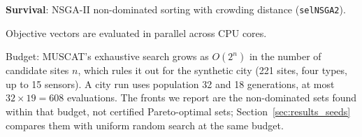 \textbf{Survival}: NSGA-II non-dominated sorting with crowding distance (\texttt{selNSGA2}).

Objective vectors are evaluated in parallel across CPU cores.

Budget: MUSCAT's exhaustive search grows as \(O(2^n)\) in the number of candidate sites \(n\), which rules it out for the synthetic city (221 sites, four types, up to 15 sensors). A city run uses population 32 and 18 generations, at most \(32\times19=608\) evaluations. The fronts we report are the non-dominated sets found within that budget, not certified Pareto-optimal sets; Section~\ref{sec:results_seeds} compares them with uniform random search at the same budget.


